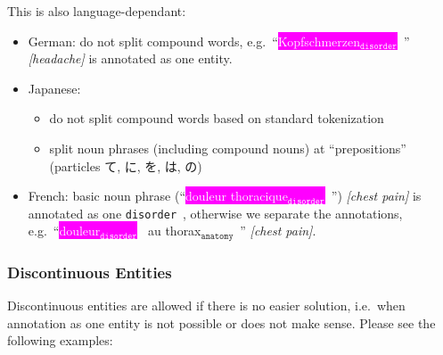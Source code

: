 \documentclass[12pt]{article}
\theoremstyle{definition}
\newcommand{\anatomy}[1]{\colorbox{dollarbill}{#1$_{\texttt{anatomy}}$}\ }
\newcommand{\disorder}[1]{\colorbox{fuchsia}{\textcolor{white}{#1$_{\texttt{disorder}}$}}\ }
\newcommand{\dis}{\texttt{disorder}\ }
\begin{document}
This is also language-dependant:
\begin{itemize}
    \item German: do not split compound words, e.g.~``\disorder{Kopfschmerzen}'' \textit{[headache]} is annotated as one entity.
    \item Japanese: 
    \begin{itemize}
        \item do not split compound words based on standard tokenization
        \item split noun phrases (including compound nouns) at ``prepositions'' (particles て, に, を, は, の)
    \end{itemize}
    
    \item French: basic noun phrase (``\disorder{douleur thoracique}'') \textit{[chest pain]} is annotated as one \dis, otherwise we separate the annotations, e.g.~``\disorder{douleur} au \anatomy{thorax}'' \textit{[chest pain]}.
\end{itemize}


\subsubsection*{Discontinuous Entities}

Discontinuous entities are allowed if there is no easier solution, i.e.~when annotation as one entity is not possible or does not make sense. 
Please see the following examples:
\end{document}

